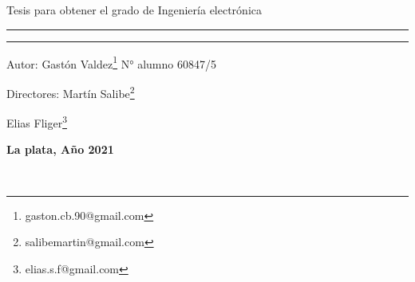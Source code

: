 \begin{titlepage}
{	
\vspace{-5mm}
\begin{center}
 \large{Tesis para obtener el grado de Ingeniería electrónica}
\end{center}
}
\vspace{-5mm}
\rule{\linewidth}{1mm}
{
\vspace{-2mm}
\begin{center}
	\textbf{\fontsize{20}{0}{\selectfont{Posicionador de antena para bajada de datos satelitales}}}
\end{center}
}
\rule{1\linewidth}{1mm} 	

 {\LARGE Autor: Gastón Valdez\footnote{gaston.cb.90@gmail.com} \hspace{50mm}  N° alumno 60847/5 \par} 
 {\LARGE Directores: Martín Salibe\footnote{salibemartin@gmail.com}\par} 
 {\hspace{28mm}\LARGE Elias Fliger\footnote{elias.s.f@gmail.com}\par} 

\vfill
{
 \begin{center}
 	\LARGE\textbf{La plata, Año 2021}
 \end{center} 
}
\end{titlepage}
\newpage
$\ $
\thispagestyle{empty} %
